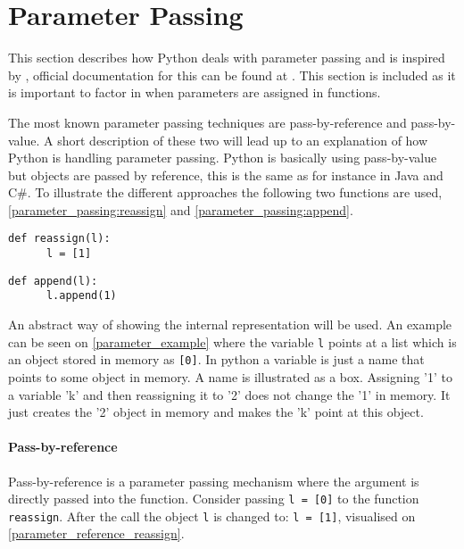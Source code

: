 \section{Parameter Passing}\label{python:parameter_passing}
This section describes how Python deals with parameter passing and is inspired by \citet{parameter_passing}, official documentation for this can be found at \citet{parameter_passing_official}.
This section is included as it is important to factor in when parameters are assigned in functions.

The most known parameter passing techniques are pass-by-reference and pass-by-value.
A short description of these two will lead up to an explanation of how Python is handling parameter passing.
Python is basically using pass-by-value but objects are passed by reference, this is the same as for instance in Java and C\#.
To illustrate the different approaches the following two functions are used, \cref{parameter_passing:reassign} and \cref{parameter_passing:append}.

\begin{lstlisting}[style=python, caption={Parameter passing: \texttt{reassign} function.}, label={parameter_passing:reassign}]
  def reassign(l):
      l = [1]
\end{lstlisting}

\begin{lstlisting}[style=python, caption={Parameter passing: \texttt{append} function.}, label={parameter_passing:append}]
  def append(l):
      l.append(1)
\end{lstlisting}

An abstract way of showing the internal representation will be used.
An example can be seen on \cref{parameter_example} where the variable \texttt{l} points at a list which is an object stored in memory as \texttt{[0]}.
In python a variable is just a name that points to some object in memory.
A name is illustrated as a box.
Assigning '1' to a variable 'k' and then reassigning it to '2' does not change the '1' in memory.
It just creates the '2' object in memory and makes the 'k' point at this object.


\paragraph{Pass-by-reference}
Pass-by-reference is a parameter passing mechanism where the argument is directly passed into the function.
Consider passing \texttt{l = [0]} to the function \texttt{reassign}.
After the call the object \texttt{l} is changed to: \texttt{l = [1]}, visualised on \cref{parameter_reference_reassign}.

